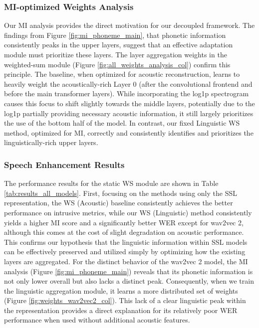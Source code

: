 \documentclass{article}
\begin{document}
\subsubsection{MI-optimized Weights Analysis}
Our MI analysis provides the direct motivation for our decoupled framework. The findings from Figure \ref{fig:mi_phoneme_main}, that phonetic information consistently peaks in the upper layers, suggest that an effective adaptation module must prioritize these layers. The layer aggregation weights in the weighted-sum module (Figure \ref{fig:all_weights_analysis_col}) confirm this principle. The baseline, when optimized for acoustic reconstruction, learns to heavily weight the acoustically-rich Layer 0 (after the convolutional frontend and before the main transformer layers). While incorporating the log1p spectrogram causes this focus to shift slightly towards the middle layers, potentially due to the log1p partially providing necessary acoustic information, it still largely prioritizes the use of the bottom half of the model. In contrast, our fixed Linguistic WS method, optimized for MI, correctly and consistently identifies and prioritizes the linguistically-rich upper layers.


\subsubsection{Speech Enhancement Results}
The performance results for the static WS module are shown in Table \ref{tab:results_all_models}. First, focusing on the methods using only the SSL representation, the WS (Acoustic) baseline consistently achieves the better performance on intrusive metrics, while our WS (Linguistic) method consistently yields a higher MI score and a significantly better WER except for wav2vec 2, although this comes at the cost of slight degradation on acoustic performance. This confirms our hypothesis that the linguistic information within SSL models can be effectively preserved and utilized simply by optimizing how the existing layers are aggregated. 
For the distinct behavior of the wav2vec 2 model, the MI analysis (Figure \ref{fig:mi_phoneme_main}) reveals that its phonetic information is not only lower overall but also lacks a distinct peak. Consequently, when we train the linguistic aggregation module, it learns a more distributed set of weights (Figure \ref{fig:weights_wav2vec2_col}). This lack of a clear linguistic peak within the representation provides a direct explanation for its relatively poor WER performance when used without additional acoustic features.
\end{document}
